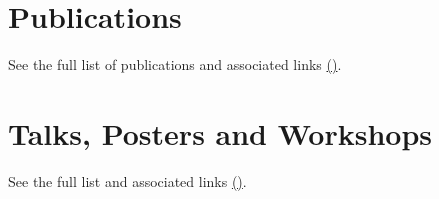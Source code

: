 \documentclass{mycv}
\begin{document}
\section{Publications}
See the full list of publications and associated links \href{https://github.com/mxochicale/cv/blob/main/tex/publications.bib}{(\faExternalLink*)}.

\section{Talks, Posters and Workshops}
See the full list and associated links \href{https://github.com/mxochicale/cv/blob/main/tex/talks-and-posters.bib}{(\faExternalLink*)}.




\end{document}
